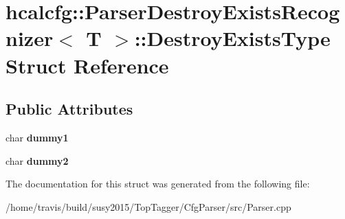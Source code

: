 \hypertarget{structhcalcfg_1_1ParserDestroyExistsRecognizer_1_1DestroyExistsType}{\section{hcalcfg\-:\-:Parser\-Destroy\-Exists\-Recognizer$<$ T $>$\-:\-:Destroy\-Exists\-Type Struct Reference}
\label{structhcalcfg_1_1ParserDestroyExistsRecognizer_1_1DestroyExistsType}
}
\subsection*{Public Attributes}
\begin{DoxyCompactItemize}
\item 
\hypertarget{structhcalcfg_1_1ParserDestroyExistsRecognizer_1_1DestroyExistsType_a58e21309aaeea19a0304b575ff8a566f}{char {\bfseries dummy1}}\label{structhcalcfg_1_1ParserDestroyExistsRecognizer_1_1DestroyExistsType_a58e21309aaeea19a0304b575ff8a566f}

\item 
\hypertarget{structhcalcfg_1_1ParserDestroyExistsRecognizer_1_1DestroyExistsType_a556b05d88dc0b53431250e59b76ca542}{char {\bfseries dummy2}}\label{structhcalcfg_1_1ParserDestroyExistsRecognizer_1_1DestroyExistsType_a556b05d88dc0b53431250e59b76ca542}

\end{DoxyCompactItemize}


The documentation for this struct was generated from the following file\-:\begin{DoxyCompactItemize}
\item 
/home/travis/build/susy2015/\-Top\-Tagger/\-Cfg\-Parser/src/Parser.\-cpp\end{DoxyCompactItemize}

